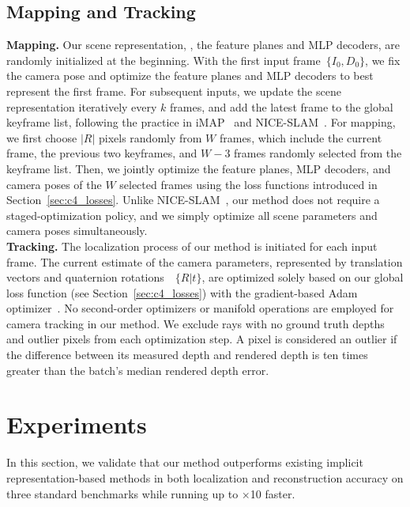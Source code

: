 \subsection{Mapping and Tracking} \label{sec:c4_map_track}
\noindent\textbf{Mapping.} Our scene representation, \ie, the feature planes and MLP decoders, are randomly initialized at the beginning. With the first input frame~$\{I_{0}, D_{0}\}$, we fix the camera pose and optimize the feature planes and MLP decoders to best represent the first frame. For subsequent inputs, we update the scene representation iteratively every $k$ frames, and add the latest frame to the global keyframe list, following the practice in iMAP~\citep{sucar2021imap} and NICE-SLAM~\citep{zhu2022nice}. For mapping, we first choose $|R|$ pixels randomly from $W$ frames, which include the current frame, the previous two keyframes, and $W - 3$ frames randomly selected from the keyframe list. Then, we jointly optimize the feature planes, MLP decoders, and camera poses of the $W$ selected frames using the loss functions introduced in Section~\ref{sec:c4_losses}. Unlike NICE-SLAM~\citep{zhu2022nice}, our method does not require a staged-optimization policy, and we simply optimize all scene parameters and camera poses simultaneously. \\

\noindent\textbf{Tracking.} The localization process of our method is initiated for each input frame. The current estimate of the camera parameters, represented by translation vectors and quaternion rotations~\citep{shoemake1985animating}~$\{R|t\}$, are optimized solely based on our global loss function (see Section~\ref{sec:c4_losses}) with the gradient-based Adam optimizer~\citep{adam}. No second-order optimizers or manifold operations are employed for camera tracking in our method. We exclude rays with no ground truth depths and outlier pixels from each optimization step. A pixel is considered an outlier if the difference between its measured depth and rendered depth is ten times greater than the batch's median rendered depth error.

\section{Experiments} \label{sec:c4_experiments}
In this section, we validate that our method outperforms existing implicit representation-based methods in both localization and reconstruction accuracy on three standard benchmarks while running up to $\times$10 faster.

